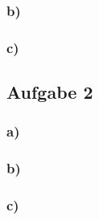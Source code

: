 \documentclass[11pt]{article}
\begin{document}
\subsubsection*{b)}

\subsubsection*{c)}

\subsection*{Aufgabe 2}

\subsubsection*{a)}

\subsubsection*{b)}

\subsubsection*{c)}
\end{document}

